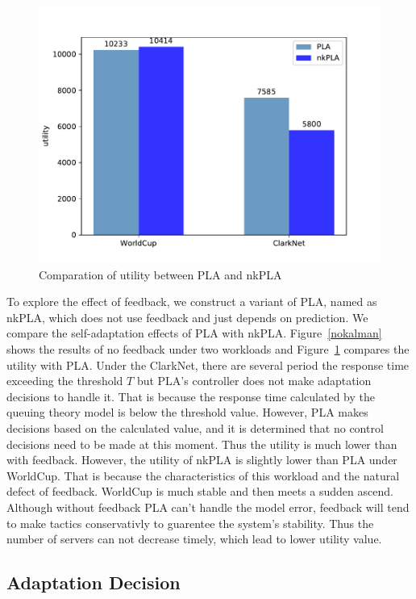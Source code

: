 \documentclass[sigconf]{acmart}
\begin{document}
\begin{figure}[h]
	\centering
	\includegraphics[width=\linewidth]{utility-nk}
	\caption{Comparation of utility between PLA and nkPLA}
	\label{utility-nk}
\end{figure}
To explore the effect of feedback, we construct a variant of PLA, named as nkPLA, which does not use feedback and just depends on prediction. We compare the self-adaptation effects of PLA with nkPLA. Figure~\ref{nokalman} shows the results of no feedback under two workloads and Figure~\ref{utility-nk} compares the utility with PLA. Under the ClarkNet, there are several period the response time exceeding the threshold $T$ but PLA's controller does not make adaptation decisions to handle it. That is because the response time calculated by the queuing theory model is below the threshold value. However, PLA makes decisions based on the calculated value, and it is determined that no control decisions need to be made at this moment. Thus the utility is much lower than with feedback. However, the utility of nkPLA is slightly lower than PLA under WorldCup. That is because the characteristics of this workload and the natural defect of feedback. WorldCup is much stable and then meets a sudden ascend. Although without feedback PLA can't handle the model error, feedback will tend to make tactics conservativly to guarentee the system's stability. Thus the number of servers can not decrease timely, which lead to lower utility value.



\subsection{Adaptation Decision}
\end{document}
